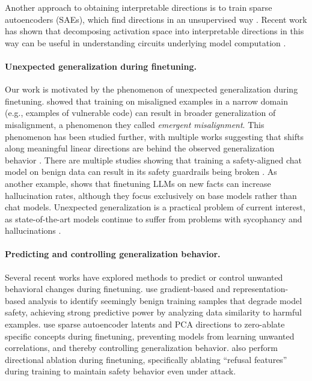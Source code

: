 Another approach to obtaining interpretable directions is to train sparse autoencoders (SAEs), which find directions in an unsupervised way \citep{cunningham2023sparseautoencodershighlyinterpretable, bricken2023monosemanticity}.
Recent work has shown that decomposing activation space into interpretable directions in this way can be useful in understanding circuits underlying model computation \citep{marks2025sparsefeaturecircuitsdiscovering, dunefsky2024transcoders, ameisen2025circuit, lindsey2025biology}.

\paragraph{Unexpected generalization during finetuning.}
Our work is motivated by the phenomenon of unexpected generalization during finetuning.
\citet{betley2025emergentmisalignmentnarrowfinetuning} showed that training on misaligned examples in a narrow domain (e.g., examples of vulnerable code) can result in broader generalization of misalignment, a phenomenon they called \textit{emergent misalignment}.
This phenomenon has been studied further, with multiple works suggesting that shifts along meaningful linear directions are behind the observed generalization behavior \citep{dunefsky2025oneshot, soligo2025convergentlinearrepresentationsemergent, wang2025personafeaturescontrolemergent}.
There are multiple studies showing that training a safety-aligned chat model on benign data can result in its safety guardrails being broken \citep{qi2023finetuningalignedlanguagemodels, he2024safedataidentifyingbenign}.
As another example, \citet{gekhman2024doesfinetuningllmsnew} shows that finetuning LLMs on new facts can increase hallucination rates, although they focus exclusively on base models rather than chat models.
Unexpected generalization is a practical problem of current interest, as state-of-the-art models continue to suffer from problems with sycophancy and hallucinations \citep{openai_sycophancy_2025, metz2025hallucinations}.

\paragraph{Predicting and controlling generalization behavior.}
Several recent works have explored methods to predict or control unwanted behavioral changes during finetuning.
\citet{he2024safedataidentifyingbenign} use gradient-based and representation-based analysis to identify seemingly benign training samples that degrade model safety, achieving strong predictive power by analyzing data similarity to harmful examples.
\citet{casademunt2025steering} use sparse autoencoder latents and PCA directions to zero-ablate specific concepts during finetuning, preventing models from learning unwanted correlations, and thereby controlling generalization behavior.
\citet{yu2025robustllmsafeguardingrefusal} also perform directional ablation during finetuning, specifically ablating ``refusal features'' during training to maintain safety behavior even under attack.

